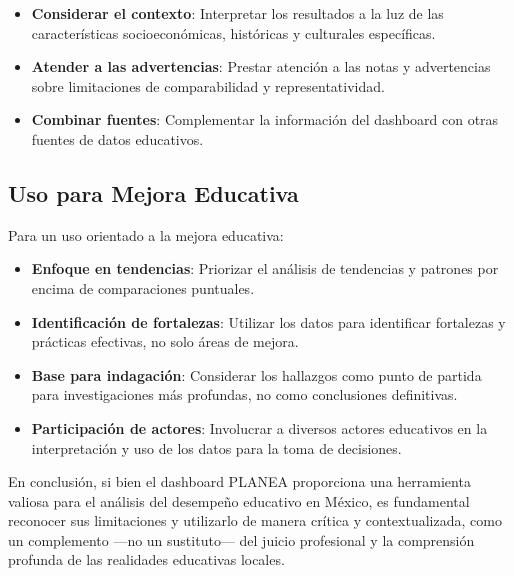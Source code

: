 \begin{itemize}
    \item \textbf{Considerar el contexto}: Interpretar los resultados a la luz de las características socioeconómicas, históricas y culturales específicas.
    
    \item \textbf{Atender a las advertencias}: Prestar atención a las notas y advertencias sobre limitaciones de comparabilidad y representatividad.
    
    \item \textbf{Combinar fuentes}: Complementar la información del dashboard con otras fuentes de datos educativos.
\end{itemize}

\subsection{Uso para Mejora Educativa}
Para un uso orientado a la mejora educativa:

\begin{itemize}
    \item \textbf{Enfoque en tendencias}: Priorizar el análisis de tendencias y patrones por encima de comparaciones puntuales.
    
    \item \textbf{Identificación de fortalezas}: Utilizar los datos para identificar fortalezas y prácticas efectivas, no solo áreas de mejora.
    
    \item \textbf{Base para indagación}: Considerar los hallazgos como punto de partida para investigaciones más profundas, no como conclusiones definitivas.
    
    \item \textbf{Participación de actores}: Involucrar a diversos actores educativos en la interpretación y uso de los datos para la toma de decisiones.
\end{itemize}

En conclusión, si bien el dashboard PLANEA proporciona una herramienta valiosa para el análisis del desempeño educativo en México, es fundamental reconocer sus limitaciones y utilizarlo de manera crítica y contextualizada, como un complemento —no un sustituto— del juicio profesional y la comprensión profunda de las realidades educativas locales.
